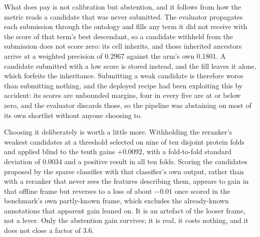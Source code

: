 What does pay is not calibration but abstention, and it follows from how the
metric reads a candidate that was never submitted. The evaluator propagates each
submission through the ontology and fills any term it did not receive with the
score of that term's best descendant, so a candidate withheld from the submission
does not score zero: its cell inherits, and those inherited ancestors arrive at a
weighted precision of 0.2967 against the arm's own 0.1801. A candidate submitted
with a low score is stored instead, and the fill leaves it alone, which forfeits
the inheritance. Submitting a weak candidate is therefore worse than submitting
nothing, and the deployed recipe had been exploiting this by accident: its scores
are unbounded margins, four in every five are at or below zero, and the evaluator
discards those, so the pipeline was abstaining on most of its own shortlist
without anyone choosing to.

Choosing it deliberately is worth a little more. Withholding the reranker's
weakest candidates at a threshold selected on nine of ten disjoint protein folds
and applied blind to the tenth gains $+0.0092$, with a fold-to-fold standard
deviation of $0.0034$ and a positive result in all ten folds. Scoring the
candidates proposed by the sparse classifier with that classifier's own output,
rather than with a reranker that never sees the features describing them, appears to
gain in that offline frame but reverses to a loss of about $-0.01$ once scored in the
benchmark's own partly-known frame, which excludes the already-known annotations that
apparent gain leaned on. It is an artefact of the looser frame, not a lever. Only the
abstention gain survives; it is real, it costs nothing, and it does not close a
factor of 3.6.

